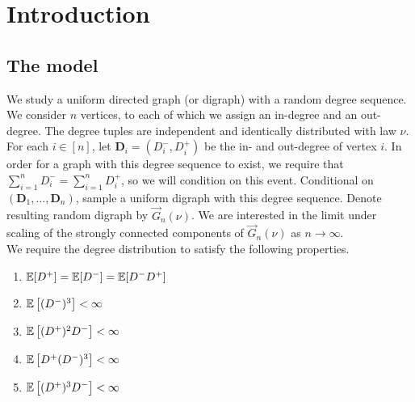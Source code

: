\section{Introduction}

\subsection{The model}
We study a uniform directed graph (or digraph) with a random degree sequence. We consider $n$ vertices, to each of which we assign an in-degree and an out-degree. The degree tuples are independent and identically distributed with law $\nu$. For each $i\in [n]$, let $\mathbf{D}_i=(D^-_i,D^+_i)$ be the in- and out-degree of vertex $i$. In order for a graph with this degree sequence to exist, we require that $\sum_{i=1}^n D^-_i=\sum_{i=1}^n D^+_i$, so we will condition on this event. Conditional on $(\mathbf{D}_1,\dots,\mathbf{D}_n)$, sample a uniform digraph with this degree sequence. Denote resulting random digraph by $\vec{G}_n(\nu)$. We are interested in the limit under scaling of the strongly connected components of $\vec{G}_n(\nu)$ as $n\to \infty$.  \\

We require the degree distribution to satisfy the following properties.


\begin{enumerate}
    \item \label{cond.mu}${\mathbb E}[D^+]={\mathbb E}[D^-]={\mathbb E}[D^-D^+]$
     \item \label{cond.gamma}${\mathbb E}\left[(D^-)^3\right]<\infty$
    \item \label{cond.rho} ${\mathbb E}\left[(D^+)^2 D^-\right]<\infty$
      \item \label{cond.iota} ${\mathbb E}\left[D^+(D^-)^3\right]<\infty$
      \item ${\mathbb E}\left[(D^+)^3D^-\right]<\infty$
\end{enumerate}

